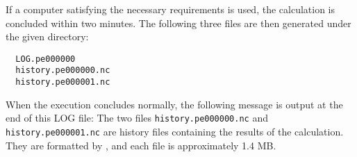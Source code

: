 If a computer satisfying the necessary requirements is used,
the calculation is concluded within two minutes.
The following three files are then generated under the given directory:
\begin{verbatim}
  LOG.pe000000
  history.pe000000.nc
  history.pe000001.nc
\end{verbatim}
When the execution concludes normally,
the following message is output at the end of this LOG file:
The two files \verb|history.pe000000.nc| and \verb|history.pe000001.nc| are history files containing the results of the calculation. They are formatted by \netcdf, and each file is approximately 1.4 MB.
